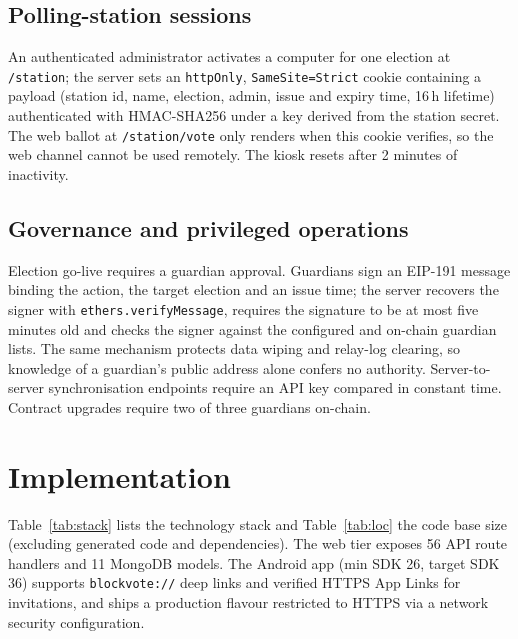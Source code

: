 \documentclass[conference]{IEEEtran}
\newcommand{\code}[1]{\texttt{\small #1}}
\begin{document}
\subsection{Polling-station sessions}
An authenticated administrator activates a computer for one election at \code{/station}; the server sets an \code{httpOnly}, \code{SameSite=Strict} cookie containing a payload (station id, name, election, admin, issue and expiry time, 16\,h lifetime) authenticated with HMAC-SHA256 under a key derived from the station secret. The web ballot at \code{/station/vote} only renders when this cookie verifies, so the web channel cannot be used remotely. The kiosk resets after 2 minutes of inactivity.

\subsection{Governance and privileged operations}
Election go-live requires a guardian approval. Guardians sign an EIP-191 message binding the action, the target election and an issue time; the server recovers the signer with \code{ethers.verifyMessage}, requires the signature to be at most five minutes old and checks the signer against the configured and on-chain guardian lists. The same mechanism protects data wiping and relay-log clearing, so knowledge of a guardian's public address alone confers no authority. Server-to-server synchronisation endpoints require an API key compared in constant time. Contract upgrades require two of three guardians on-chain.

\section{Implementation}
\label{sec:impl}

Table~\ref{tab:stack} lists the technology stack and Table~\ref{tab:loc} the code base size (excluding generated code and dependencies). The web tier exposes 56 API route handlers and 11 MongoDB models. The Android app (min SDK 26, target SDK 36) supports \code{blockvote://} deep links and verified HTTPS App Links for invitations, and ships a production flavour restricted to HTTPS via a network security configuration.
\end{document}
